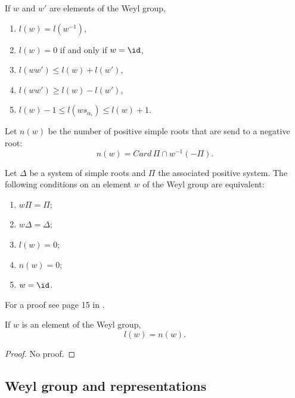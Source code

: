 \begin{lemma}
	If \( w\) and \( w'\) are elements of the Weyl group,
	\begin{enumerate}
		\item
		      \( l(w)=l(w^{-1})\),
		\item
		      \( l(w)=0\) if and only if \( w=\id\),
		\item
		      \( l(ww')\leq l(w)+l(w')\),
		\item
		      \( l(ww')\geq l(w)-l(w')\),
		\item
		      \( l(w)-1\leq l(ws_{\alpha_i})\leq l(w)+1\).
	\end{enumerate}
\end{lemma}
Let \( n(w)\) be the number of positive simple roots that are send to a negative root:
\begin{equation}
	n(w)=Card\,\Pi\cap w^{-1}(-\Pi).
\end{equation}

\begin{proposition}
	Let \( \Delta\) be a system of simple roots and \( \Pi\) the associated positive system. The following conditions on an element \( w\) of the Weyl group are equivalent:
	\begin{enumerate}
		\item
		      \( w\Pi=\Pi\);
		\item
		      \( w\Delta=\Delta\);
		\item
		      \( l(w)=0\);
		\item
		      \( n(w)=0\);
		\item
		      \( w=\id\).
	\end{enumerate}
\end{proposition}

For a proof see page 15 in \cite{HumphreysCoxeter}.

\begin{theorem}
	If \( w\) is an element of the Weyl group,
	\begin{equation}
		l(w)=n(w).
	\end{equation}
\end{theorem}

\begin{proof}
	No proof.
\end{proof}

\subsection{Weyl group and representations}

